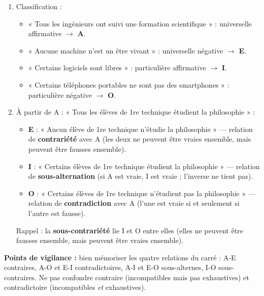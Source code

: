 \documentclass[11pt]{article}
\begin{document}
\begin{corrige}
\begin{enumerate}
    \item Classification :
    \begin{itemize}
        \item « Tous les ingénieurs ont suivi une formation scientifique » : universelle affirmative $\rightarrow$ \textbf{A}.
        \item « Aucune machine n'est un être vivant » : universelle négative $\rightarrow$ \textbf{E}.
        \item « Certains logiciels sont libres » : particulière affirmative $\rightarrow$ \textbf{I}.
        \item « Certains téléphones portables ne sont pas des smartphones » : particulière négative $\rightarrow$ \textbf{O}.
    \end{itemize}
    \item À partir de A : « Tous les élèves de 1re technique étudient la philosophie » :
    \begin{itemize}
        \item \textbf{E} : « Aucun élève de 1re technique n'étudie la philosophie » — relation de \textbf{contrariété} avec A (les deux ne peuvent être vraies ensemble, mais peuvent être fausses ensemble).
        \item \textbf{I} : « Certains élèves de 1re technique étudient la philosophie » — relation de \textbf{sous-alternation} (si A est vraie, I est vraie ; l'inverse ne tient pas).
        \item \textbf{O} : « Certains élèves de 1re technique n'étudient pas la philosophie » — relation de \textbf{contradiction} avec A (l'une est vraie si et seulement si l'autre est fausse).
    \end{itemize}
    Rappel : la \textbf{sous-contrariété} lie I et O entre elles (elles ne peuvent être fausses ensemble, mais peuvent être vraies ensemble).
\end{enumerate}
\textbf{Points de vigilance :} bien mémoriser les quatre relations du carré : A-E contraires, A-O et E-I contradictoires, A-I et E-O sous-alternes, I-O sous-contraires. Ne pas confondre contraire (incompatibles mais pas exhaustives) et contradictoire (incompatibles \emph{et} exhaustives).
\end{corrige}
\end{document}

